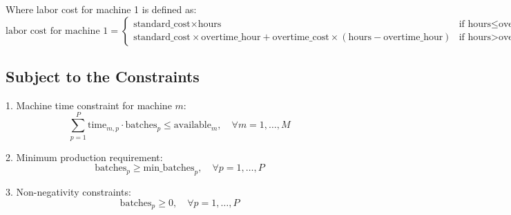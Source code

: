 \documentclass{article}
\begin{document}
Where labor cost for machine 1 is defined as:
\[
\text{labor cost for machine 1} = \begin{cases}
\text{standard\_cost} \times \text{hours} & \text{if } \text{hours} \leq \text{overtime\_hour} \\
\text{standard\_cost} \times \text{overtime\_hour} + \text{overtime\_cost} \times (\text{hours} - \text{overtime\_hour}) & \text{if } \text{hours} > \text{overtime\_hour}
\end{cases}
\]

\subsection*{Subject to the Constraints}
1. Machine time constraint for machine \( m \):
\[
\sum_{p=1}^{P} \text{time}_{m,p} \cdot \text{batches}_{p} \leq \text{available}_{m}, \quad \forall m = 1, \ldots, M
\]

2. Minimum production requirement:
\[
\text{batches}_{p} \geq \text{min\_batches}_{p}, \quad \forall p = 1, \ldots, P
\]

3. Non-negativity constraints:
\[
\text{batches}_{p} \geq 0, \quad \forall p = 1, \ldots, P
\]
\end{document}
